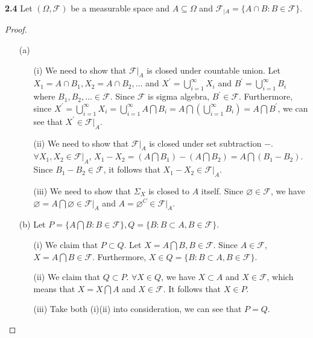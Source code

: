\noindent\textbf{2.4}
Let $(\Omega,\mathcal{F})$ be a measurable space and $A \subseteq \Omega$ and $\mathcal{F}_{|A} = \{A \cap B: B \in \mathcal{F}\}$.

\begin{proof}
    \begin{enumerate}
        \item[(a)] \begin{enumerate}
                \item[(i)] We need to show that $\mathcal{F}|_A$ is closed under countable union. Let $X_1=A\cap B_1,X_2=A\cap B_2,...$ and $X^{\prime}=\bigcup\limits^{\infty}_{i=1}X_i$ and $B^{\prime}=\bigcup\limits^{\infty}_{i=1}B_i$ where $B_1,B_2,...\in \mathcal{F}$. Since $\mathcal{F}$ is sigma algebra, $B^{\prime}\in \mathcal{F}$. Furthermore, since $X^{\prime}=\bigcup^{\infty}_{i=1}X_i=\bigcup^{\infty}_{i=1}A\bigcap B_i=A\bigcap\left(\bigcup\limits^{\infty}_{i=1}B_i \right)=A\bigcap B^{\prime}$, we can see that $X^{\prime}\in \mathcal{F}|_A$.
                \item[(ii)] We need to show that $\mathcal{F}|_A$ is closed under set subtraction $-$. $\forall X_1,X_2\in \mathcal{F}|_A$, $X_1-X_2=(A\bigcap B_1)-(A\bigcap B_2)=A\bigcap(B_1-B_2)$. Since $B_1-B_2\in \mathcal{F}$, it follows that $X_1-X_2\in \mathcal{F}|_A$.
                \item[(iii)] We need to show that $\Sigma_X$ is closed to $A$ itself. Since $\varnothing \in \mathcal{F}$, we have $\varnothing=A\bigcap\varnothing\in \mathcal{F}|_A$ and $A=\varnothing^{C}\in \mathcal{F}|_A$.
              \end{enumerate}
        \item[(b)] Let $P=\{ A\bigcap B:B\in \mathcal{F} \}, Q=\{ B: B\subset A, B\in \mathcal{F} \}$.
                \begin{enumerate}
                    \item[(i)] We claim that $P\subset Q$. Let $X=A\bigcap B, B\in \mathcal{F}$. Since $A\in \mathcal{F}$, $X=A\bigcap B\in \mathcal{F}$. Furthermore, $X\in Q=\{B:B\subset A, B\in \mathcal{F} \}$.
                    \item[(ii)] We claim that $Q\subset P$. $\forall X\in Q$, we have $X\subset A$ and $X\in \mathcal{F}$, which means that $X=X\bigcap A$ and $X\in \mathcal{F}$. It follows that $X\in P$.
                    \item[(iii)] Take both (i)(ii) into consideration, we can see that $P=Q$.
                \end{enumerate}
        \end{enumerate}
\end{proof}


